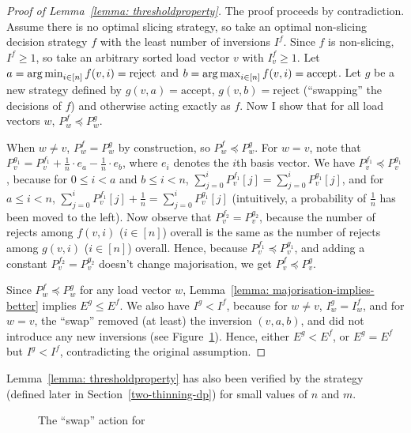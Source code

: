 \begin{proof} [Proof of Lemma~\ref{lemma: thresholdproperty}]
    The proof proceeds by contradiction. Assume there is no optimal slicing strategy, so take an optimal non-slicing decision strategy $f$ with the least number of inversions $I^f$. Since $f$ is non-slicing, $I^f\geq 1$, so take an arbitrary sorted load vector $v$ with $I^f_v\geq 1$. Let $a=\operatorname*{arg\,min}_{i\in [n]} f(v,i)=\mathrm{reject}$ and $b=\operatorname*{arg\,max}_{i\in [n]} f(v,i)=\mathrm{accept}$. Let $g$ be a new strategy defined by $g(v,a)=\mathrm{accept}$, $g(v,b)=\mathrm{reject}$ (``swapping'' the decisions of $f$) and otherwise acting exactly as $f$. Now I show that for all load vectors $w$, $P^f_w\preccurlyeq P^g_w$.
    
    When $w\neq v$, $P^f_w = P^g_w$ by construction, so $P^f_w\preccurlyeq P^g_w$. For $w=v$, note that $P^{g_1}_{v}=P^{f_1}_{v}+\frac{1}{n}\cdot e_a-\frac{1}{n}\cdot e_b$, where $e_i$ denotes the $i$th basis vector. We have $P^{f_1}_{v}\preccurlyeq P^{g_1}_{v}$, because for $0\leq i<a$ and $b\leq i<n$, $\sum_{j=0}^i P^{f_1}_{v}[j] = \sum_{j=0}^i P^{g_1}_{v}[j]$, and for $a\leq i<n$, $\sum_{j=0}^i P^{f_1}_{v}[j] + \frac{1}{n} = \sum_{j=0}^i P^{g_1}_{v}[j]$ (intuitively, a probability of $\frac{1}{n}$ has been moved to the left). Now observe that $P^{f_2}_{v}=P^{g_2}_{v}$, because the number of rejects among $f(v,i)$ ($i\in [n]$) overall is the same as the number of rejects among $g(v,i)$ ($i\in [n]$) overall. Hence, because $P^{f_1}_{v}\preccurlyeq P^{g_1}_{v}$, and adding a constant $P^{f_2}_{v}=P^{g_2}_{v}$ doesn't change majorisation, we get $P^f_v \preccurlyeq P^g_v$.
    
    
    Since $P^f_w\preccurlyeq P^g_w$ for any load vector $w$, Lemma~\ref{lemma: majorisation-implies-better} implies $E^g\leq E^f$. We also have $I^g<I^f$, because for $w\neq v$, $I^g_w=I^f_w$, and for $w=v$, the ``swap'' removed (at least) the inversion $(v,a,b)$, and did not introduce any new inversions (see Figure~\ref{two-thinning-swap-action}). Hence, either $E^g<E^f$, or $E^g=E^f$ but $I^g<I^f$, contradicting the original assumption.
\end{proof}


\begin{remark}
Lemma~\ref{lemma: thresholdproperty} has also been verified by the \DP strategy (defined later in Section~\ref{two-thinning-dp}) for small values of $n$ and $m$.
\end{remark}



\begin{figure}
    \centering
    \caption{The ``swap'' action for \TwoThinning}
    \label{two-thinning-swap-action}
\end{figure}


